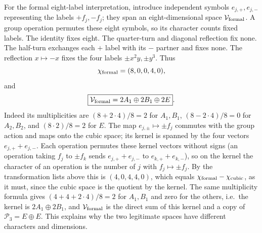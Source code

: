 For the formal eight-label interpretation, introduce independent
symbols $e_{j,+},e_{j,-}$ representing the labels $+f_j,-f_j$; they
span an eight-dimensional space $\mathcal V_{\rm formal}$.
A group operation permutes these eight symbols, so its character
counts fixed labels. The identity fixes eight. The quarter-turn
and diagonal reflection fix none. The half-turn exchanges
each $+$ label with its $-$ partner and fixes none.
The reflection $x\mapsto-x$ fixes the four labels
$\pm x^2y,\pm y^3$. Thus
\[
\chi_{\rm formal}=(8,0,0,4,0),
\]
and
\[
\boxed{\mathcal V_{\rm formal}=2A_1\oplus2B_1\oplus2E}.
\]
Indeed its multiplicities are
$(8+2\cdot4)/8=2$ for $A_1,B_1$,
$(8-2\cdot4)/8=0$ for $A_2,B_2$, and
$(8\cdot2)/8=2$ for $E$.
The map $e_{j,\pm}\mapsto\pm f_j$ commutes with the group action
and maps onto the cubic space; its kernel is spanned by the four
vectors $e_{j,+}+e_{j,-}$. Each operation permutes these kernel
vectors without signs (an operation taking $f_j$ to $\pm f_k$ sends
$e_{j,+}+e_{j,-}$ to $e_{k,+}+e_{k,-}$), so on the kernel the
character of an operation is the number of $j$ with
$f_j\mapsto\pm f_j$. By the transformation lists above this is
$(4,0,4,4,0)$, which equals $\chi_{\rm formal}-\chi_{\rm cubic}$, as
it must, since the cubic space is the quotient by the kernel. The same
multiplicity formula gives $(4+4+2\cdot4)/8=2$ for $A_1,B_1$ and
zero for the others, i.e.\ the kernel is $2A_1\oplus2B_1$, and
$\mathcal V_{\rm formal}$ is the direct sum of this kernel and a copy
of $\mathcal P_3=E\oplus E$. This explains why the two legitimate
spaces have different characters and dimensions.

